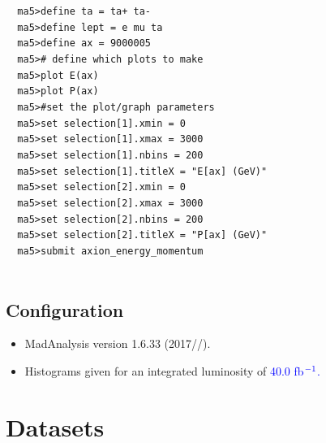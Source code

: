 \documentclass[a4paper, 10pt]{article}
\begin{document}
\texttt{ }\texttt{ }\texttt{ma5>define ta = ta+ ta-\\
}
\texttt{ }\texttt{ }\texttt{ma5>define lept = e mu ta\\
}
\texttt{ }\texttt{ }\texttt{ma5>define ax = 9000005\\
}
\texttt{ }\texttt{ }\texttt{ma5>\# define which plots to make\\
}
\texttt{ }\texttt{ }\texttt{ma5>plot E(ax)\\
}
\texttt{ }\texttt{ }\texttt{ma5>plot P(ax)\\
}
\texttt{ }\texttt{ }\texttt{ma5>\#set the plot/\-graph parameters\\
}
\texttt{ }\texttt{ }\texttt{ma5>set selection[1].xmin = 0\\
}
\texttt{ }\texttt{ }\texttt{ma5>set selection[1].xmax = 3000\\
}
\texttt{ }\texttt{ }\texttt{ma5>set selection[1].nbins = 200\\
}
\texttt{ }\texttt{ }\texttt{ma5>set selection[1].titleX = "E[ax] (GeV)"\\
}
\texttt{ }\texttt{ }\texttt{ma5>set selection[2].xmin = 0\\
}
\texttt{ }\texttt{ }\texttt{ma5>set selection[2].xmax = 3000\\
}
\texttt{ }\texttt{ }\texttt{ma5>set selection[2].nbins = 200\\
}
\texttt{ }\texttt{ }\texttt{ma5>set selection[2].titleX = "P[ax] (GeV)"\\
}
\texttt{ }\texttt{ }\texttt{ma5>submit axion\_energy\_momentum\\
}
\texttt{ }\texttt{ }\subsection{ Configuration}

\begin{itemize}
  \item MadAnalysis version 1.6.33 (2017//).
   \item Histograms given for an integrated luminosity of \textcolor{blue}{40.0}\textcolor{blue}{ fb}$^{\textcolor{blue}{-1}}$\textcolor{blue}{.}
\textcolor{blue}{}
\end{itemize}
\newpage
\section{ Datasets}
\end{document}

